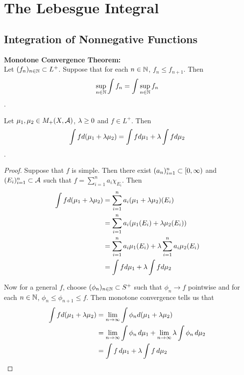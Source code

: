 \documentclass{book}
\begin{document}
	
	
	
	
	
	
	
	
	
	
	
	
	
	
	
	
	\newpage
	\chapter{The Lebesgue Integral}
	
	\section{Integration of Nonnegative Functions}
	
	\begin{thm}  \textbf{Monotone Convergence Theorem:} \\
		Let $(f_n)_{n \in \mathbb{N}} \subset L^+$. Suppose that for each $n \in \mathbb{N}$, $f_n \leq f_{n+1}$. Then $$\sup_{n \in \mathbb{N}} \int f_n = \int \sup_{n \in \mathbb{N}} f_n$$.
	\end{thm}
	
	\begin{ex}  
		Let $\mu_1, \mu_2 \in M_+(X, \mathcal{A})$, $\lambda \geq 0$ and $f \in L^+$. Then 
		$$\int f d (\mu_1 + \lambda \mu_2) = \int f d\mu_1 + \lambda \int f d\mu_2$$.  
	\end{ex}
	
	\begin{proof}
		Suppose that $f$ is simple. Then there exist $(a_n)_{i=1}^n \subset [0,\infty)$ and $(E_i)_{i=1}^n \subset \mathcal{A}$ such that $f = \sum\limits_{i =1}^n a_i \chi_{E_i}$. Then 
		\begin{align*}
			\int f d(\mu_1 + \lambda \mu_2) 
			&= \sum\limits_{i =1}^n a_i (\mu_1 + \lambda \mu_2)(E_i)\\
			&= \sum\limits_{i =1}^n a_i (\mu_1(E_i) + \lambda \mu_2(E_i))\\
			&= \sum\limits_{i =1}^n a_i \mu_1(E_i) + \lambda \sum\limits_{i =1}^n a_i   \mu_2(E_i)\\
			&= \int f d\mu_1 + \lambda \int f d\mu_2
		\end{align*}
		
		Now for a general $f$, choose $(\phi_n)_{n \in \mathbb{N}} \subset S^+$ such that $\phi_n \rightarrow f$ pointwise and for each $n \in \mathbb{N}$, $\phi_n \leq \phi_{n+1} \leq f$. Then monotone convergence tells us that 
		\begin{align*}
			\int f d(\mu_1 + \lambda \mu_2) 
			&= \lim \limits_{n \rightarrow \infty} \int \phi_n d(\mu_1 + \lambda \mu_2)\\
			&= \lim \limits_{n \rightarrow \infty} \int \phi_n \, d \mu_1 + \lim \limits_{n \rightarrow \infty} \lambda \int \phi_n \, d \mu_2 \\
			&= \int f \, d \mu_1 +  \lambda \int f \, d \mu_2
		\end{align*}
		
	\end{proof}
	
\end{document}
